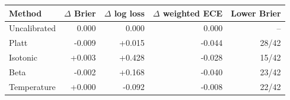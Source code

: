 \begin{tabular}{lrrrr}
\toprule
Method & $\Delta$ Brier & $\Delta$ log loss & $\Delta$ weighted ECE & Lower Brier \\
\midrule
Uncalibrated & 0.000 & 0.000 & 0.000 & -- \\
Platt & -0.009 & +0.015 & -0.044 & 28/42 \\
Isotonic & +0.003 & +0.428 & -0.028 & 15/42 \\
Beta & -0.002 & +0.168 & -0.040 & 23/42 \\
Temperature & +0.000 & -0.092 & -0.008 & 22/42 \\
\bottomrule
\end{tabular}
